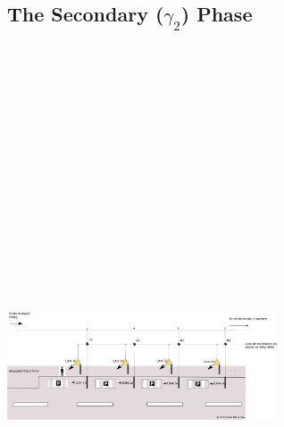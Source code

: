 \documentclass[a4paper,11pt]{article}
\begin{document}
\newpage
\subsection{The Secondary ($\gamma_2$) Phase}
 \includegraphics[width=8cm,height = 19cm ]{Secondary Phase.png}
\end{document}

